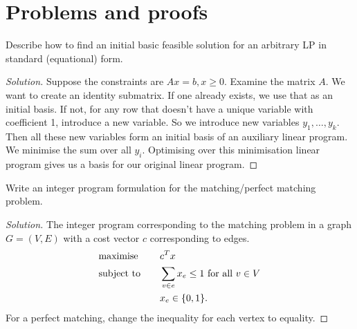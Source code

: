 \documentclass[12pt]{article}
\newenvironment{problem}[2][Problem]{\begin{trivlist}
\item[\hskip \labelsep {\bfseries #1}\hskip \labelsep {\bfseries #2.}]}{\end{trivlist}}
\theoremstyle{plain}
\begin{document}
\section{Problems and proofs}
\begin{problem}{1}
    Describe how to find an initial basic feasible solution for an arbitrary LP in standard (equational) form.
\end{problem}
\begin{proof}[Solution]
    Suppose the constraints are $Ax = b, x\geq 0$. Examine the matrix $A$. We want to create an identity submatrix. If one already exists, we use that as an initial basis. If not, for any row that doesn't have a unique variable with coefficient 1, introduce a new variable. So we introduce new variables $y_1,\ldots,y_k$. Then all these new variables form an initial basis of an auxiliary linear program. We minimise the sum over all $y_i$. Optimising over this minimisation linear program gives us a basis for our original linear program.
\end{proof}

\begin{problem}{2}
    Write an integer program formulation for the matching/perfect matching problem.
\end{problem}
\begin{proof}[Solution]
    The integer program corresponding to the matching problem in a graph $G=(V,E)$ with a cost vector $c$ corresponding to edges.
    \begin{alignat*}{2}
        & \textup{maximise} & \quad & c^Tx\\
        & \textup{subject to} & & \sum_{v\in e} x_e \leq 1\ \text{for all}\ v\in V\\
        &  & & x_e\in\{0,1\}.
    \end{alignat*}
    For a perfect matching, change the inequality for each vertex to equality.
\end{proof}
\end{document}

